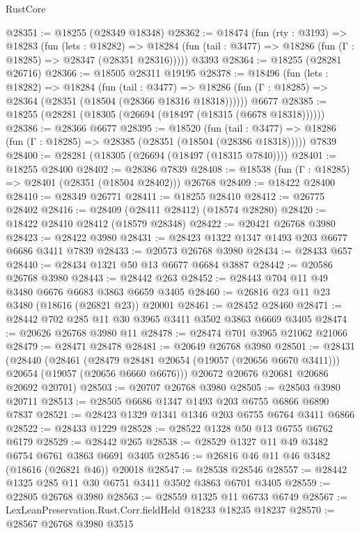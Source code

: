 \begin{lexlean}{RustCore}
\begin{coremodule}
@28351 := @18255 (@28349 @18348)
@28362 := @18474
    (fun (rty : @3193) =>
    @18283
      (fun (lets : @18282) =>
      @18284 (fun (tail : @3477) => @18286 (fun (Γ : @18285) => @28347 (@28351 @28316)))))
    @3393
@28364 := @18255 (@28281 @26716)
@28366 := @18505 @28311 @19195
@28378 := @18496
    (fun (lets : @18282) =>
    @18284
      (fun (tail : @3477) =>
      @18286 (fun (Γ : @18285) => @28364 (@28351 (@18504 (@28366 @18316 @18318))))))
    @6677
@28385 := @18255 (@28281 (@18305 (@26694 (@18497 (@18315 (@6678 @18318))))))
@28386 := @28366 @6677
@28395 := @18520
    (fun (tail : @3477) => @18286 (fun (Γ : @18285) => @28385 (@28351 (@18504 (@28386 @18318)))))
    @7839
@28400 := @28281 (@18305 (@26694 (@18497 (@18315 @7840))))
@28401 := @18255 @28400
@28402 := @28386 @7839
@28408 := @18538 (fun (Γ : @18285) => @28401 (@28351 (@18504 @28402))) @26768
@28409 := @18422 @28400
@28410 := @28349 @26771
@28411 := @18255 @28410
@28412 := @26775 @28402
@28416 := @28409 (@28411 @28412) (@18574 @28280)
@28420 := @18422 @28410 @28412 (@18579 @28348)
@28422 := @20421 @26768 @3980
@28423 := @28422 @3980
@28431 := @28423 @1322 @1347 @1493 @203 @6677 @6686 @3411 @7839
@28433 := @20573 @26768 @3980
@28434 := @28433 @657
@28440 := @28434 @1321 @50 @13 @6677 @6684 @3887
@28442 := @20586 @26768 @3980
@28443 := @28442 @263
@28452 := @28443 @704 @11 @49 @3480 @6676 @6683 @3863 @6659 @3405
@28460 := @26816 @23 @11 @23 @3480 (@18616 (@26821 @23)) @20001
@28461 := @28452 @28460
@28471 := @28442 @702 @285 @11 @30 @3965 @3411 @3502 @3863 @6669 @3405
@28474 := @20626 @26768 @3980 @11
@28478 := @28474 @701 @3965 @21062 @21066
@28479 := @28471 @28478
@28481 := @20649 @26768 @3980
@28501 := @28431
    (@28440
      (@28461
        (@28479 @28481 @20654 (@19057 (@20656 @6670 @3411)))
        @20654
        (@19057 (@20656 @6660 @6676)))
      @20672
      @20676
      @20681
      @20686
      @20692
      @20701)
@28503 := @20707 @26768 @3980
@28505 := @28503 @3980 @20711
@28513 := @28505 @6686 @1347 @1493 @203 @6755 @6866 @6890 @7837
@28521 := @28423 @1329 @1341 @1346 @203 @6755 @6764 @3411 @6866
@28522 := @28433 @1229
@28528 := @28522 @1328 @50 @13 @6755 @6762 @6179
@28529 := @28442 @265
@28538 := @28529 @1327 @11 @49 @3482 @6754 @6761 @3863 @6691 @3405
@28546 := @26816 @46 @11 @46 @3482 (@18616 (@26821 @46)) @20018
@28547 := @28538 @28546
@28557 := @28442 @1325 @285 @11 @30 @6751 @3411 @3502 @3863 @6701 @3405
@28559 := @22805 @26768 @3980
@28563 := @28559 @1325 @11 @6733 @6749
@28567 := LexLeanPreservation.Rust.Corr.fieldHeld @18233 @18235 @18237
@28570 := @28567 @26768 @3980 @3515

\end{coremodule}
\end{lexlean}
